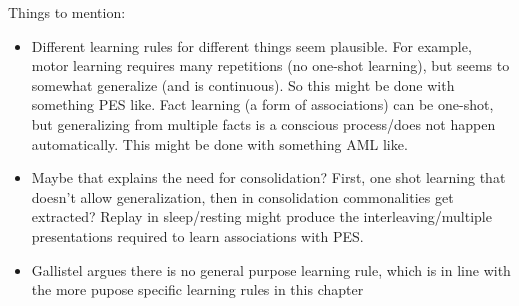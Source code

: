 Things to mention:
\begin{itemize}
    \item Different learning rules for different things seem plausible. For example, motor learning requires many repetitions (no one-shot learning), but seems to somewhat generalize (and is continuous). So this might be done with something PES like. Fact learning (a form of associations) can be one-shot, but generalizing from multiple facts is a conscious process/does not happen automatically. This might be done with something AML like.
    \item Maybe that explains the need for consolidation? First, one shot learning that doesn't allow generalization, then in consolidation commonalities get extracted? Replay in sleep/resting might produce the interleaving/multiple presentations required to learn associations with PES\@.
    \item Gallistel argues there is no general purpose learning rule, which is in line with the more pupose specific learning rules in this chapter
\end{itemize}
